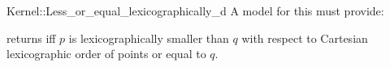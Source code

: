 \begin{ccRefFunctionObjectConcept}{Kernel::Less_or_equal_lexicographically_d}
A model for this must provide:


 {returns  iff $p$ is
  lexicographically smaller than $q$ with respect to Cartesian
  lexicographic order of points or equal to $q$. }

\end{ccRefFunctionObjectConcept}
